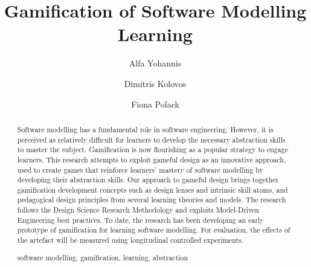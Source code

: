 \documentclass[runningheads,a4paper]{llncs}
\newcommand{\keywords}[1]{\par\addvspace\baselineskip
\noindent\keywordname\enspace\ignorespaces#1}
\begin{document}
\mainmatter %

\title{Gamification of Software Modelling Learning}


%
%
\author{Alfa Yohannis \and Dimitris Kolovos \and Fiona Polack} %
%


%
%

\maketitle

\begin{abstract}
Software modelling has a fundamental role in software engineering. However, it is perceived as relatively difficult for learners to develop the necessary abstraction skills to master the subject. Gamification is now flourishing as a popular strategy to engage learners. This research attempts to exploit gameful design as an innovative approach, used to create games that reinforce learners' mastery of software modelling by developing their abstraction skills. Our approach to gameful design brings together gamification development concepts such as design lenses and intrinsic skill atoms, and pedagogical design principles from several learning theories and models. The research follows the Design Science Research Methodology and exploits Model-Driven Engineering best practices. To date, the research has been developing an early prototype of gamification for learning software modelling. For evaluation, the effects of the artefact will be measured using longitudinal controlled experiments.
\keywords{software modelling, gamification, learning, abstraction}
\end{abstract}
\end{document}
